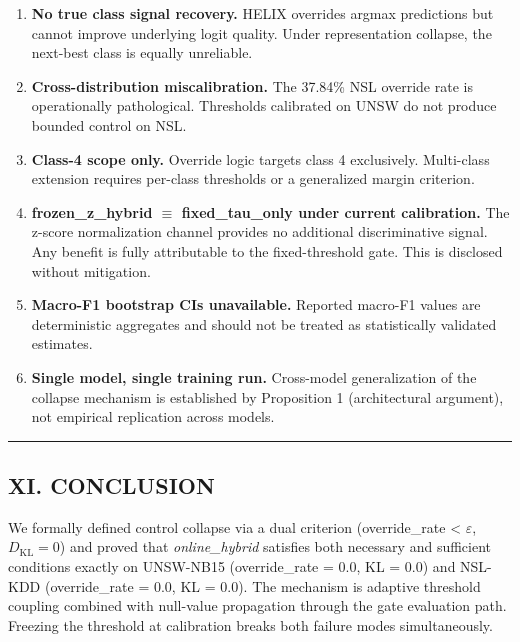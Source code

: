 \documentclass[
  conference]{IEEEtran}
\begin{document}
\begin{enumerate}
\def\labelenumi{\arabic{enumi}.}
\item
  \textbf{No true class signal recovery.} HELIX overrides argmax
  predictions but cannot improve underlying logit quality. Under
  representation collapse, the next-best class is equally unreliable.
\item
  \textbf{Cross-distribution miscalibration.} The 37.84\% NSL override
  rate is operationally pathological. Thresholds calibrated on UNSW do
  not produce bounded control on NSL.
\item
  \textbf{Class-4 scope only.} Override logic targets class 4
  exclusively. Multi-class extension requires per-class thresholds or a
  generalized margin criterion.
\item
  \textbf{frozen\_z\_hybrid \(\equiv\) fixed\_tau\_only under current
  calibration.} The z-score normalization channel provides no additional
  discriminative signal. Any benefit is fully attributable to the
  fixed-threshold gate. This is disclosed without mitigation.
\item
  \textbf{Macro-F1 bootstrap CIs unavailable.} Reported macro-F1 values
  are deterministic aggregates and should not be treated as
  statistically validated estimates.
\item
  \textbf{Single model, single training run.} Cross-model generalization
  of the collapse mechanism is established by Proposition 1
  (architectural argument), not empirical replication across models.
\end{enumerate}

\begin{center}\rule{0.5\linewidth}{0.5pt}\end{center}

\subsection{XI. CONCLUSION}\label{xi.-conclusion}

We formally defined control collapse via a dual criterion
(override\_rate \textless{} \(\varepsilon\), \(D_{\text{KL}} = 0\)) and
proved that \emph{online\_hybrid} satisfies both necessary and
sufficient conditions exactly on UNSW-NB15 (override\_rate = 0.0, KL =
0.0) and NSL-KDD (override\_rate = 0.0, KL = 0.0). The mechanism is
adaptive threshold coupling combined with null-value propagation through
the gate evaluation path. Freezing the threshold at calibration breaks
both failure modes simultaneously.
\end{document}
